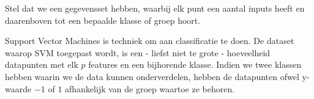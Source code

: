 \documentclass[TeamE-eindrapport]{subfiles}
\begin{document}
	
	Stel dat we een gegevensset hebben, waarbij elk punt een aantal inputs heeft en daarenboven tot een bepaalde klasse of groep hoort.

	Support Vector Machines is techniek om aan classificatie te doen. De dataset waarop SVM toegepast wordt, is een - liefst niet te grote - hoeveelheid datapunten met elk \(p\) features en een bijhorende klasse. Indien we twee klassen hebben waarin we de data kunnen onderverdelen, hebben de datapunten ofwel y-waarde \(-1\) of \(1\) afhankelijk van de groep waartoe ze behoren.
	
\end{document}
